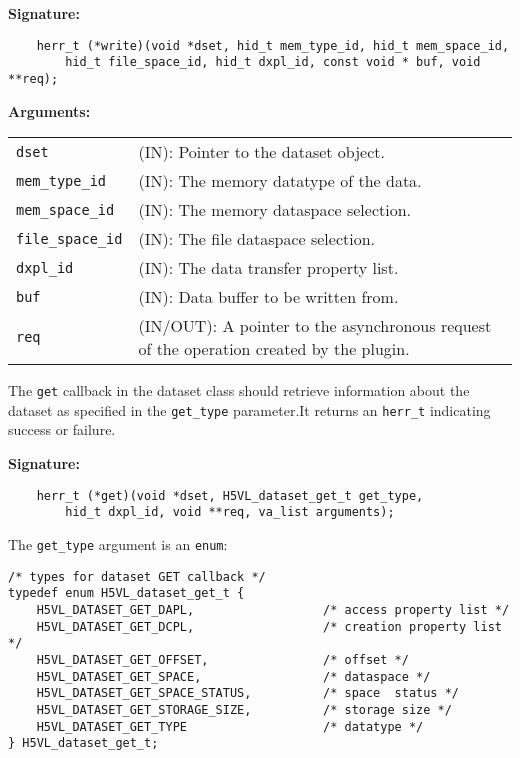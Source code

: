 \textbf{Signature:}
\begin{lstlisting}
    herr_t (*write)(void *dset, hid_t mem_type_id, hid_t mem_space_id, 
        hid_t file_space_id, hid_t dxpl_id, const void * buf, void **req);
\end{lstlisting}

\textbf{Arguments:}\\
\begin{tabular}{l p{10cm}}
  {\tt dset} & (IN): Pointer to the dataset object.\\
  {\tt mem\_type\_id} & (IN): The memory datatype of the data.\\
  {\tt mem\_space\_id} & (IN): The memory dataspace selection.\\
  {\tt file\_space\_id} & (IN): The file dataspace selection.\\
  {\tt dxpl\_id} & (IN): The data transfer property list.\\
  {\tt buf} & (IN): Data buffer to be written from.\\
  {\tt req} & (IN/OUT): A pointer to the asynchronous request of the
  operation created by the plugin.\\
\end{tabular}

The {\tt get} callback in the dataset class should retrieve
information about the dataset as specified in the {\tt get\_type}
parameter.It returns an {\tt herr\_t} indicating success or failure.

\textbf{Signature:}
\begin{lstlisting}
    herr_t (*get)(void *dset, H5VL_dataset_get_t get_type, 
        hid_t dxpl_id, void **req, va_list arguments);
\end{lstlisting}

The {\tt get\_type} argument is an {\tt enum}:
\begin{lstlisting}
/* types for dataset GET callback */
typedef enum H5VL_dataset_get_t {
    H5VL_DATASET_GET_DAPL,                  /* access property list */
    H5VL_DATASET_GET_DCPL,                  /* creation property list */
    H5VL_DATASET_GET_OFFSET,                /* offset */
    H5VL_DATASET_GET_SPACE,                 /* dataspace */
    H5VL_DATASET_GET_SPACE_STATUS,          /* space  status */
    H5VL_DATASET_GET_STORAGE_SIZE,          /* storage size */
    H5VL_DATASET_GET_TYPE                   /* datatype */
} H5VL_dataset_get_t;
\end{lstlisting}

